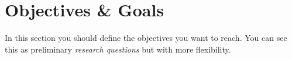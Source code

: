\section{Objectives \& Goals}
\label{sec:objectives_and_goals}

In this section you should define the objectives you want to reach. You can see this as preliminary \textit{research questions} but with more flexibility. 
